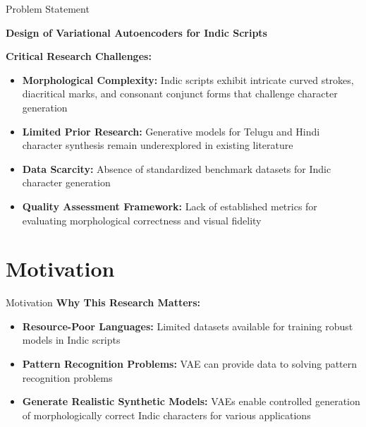\documentclass[aspectratio=169, 12pt]{beamer}
\begin{document}
\begin{frame}{Problem Statement}
    \begin{keypoint}
    \textbf{Design of Variational Autoencoders for Indic Scripts} 
    \end{keypoint}
    
    \vspace{0.5cm}
    \textbf{Critical Research Challenges:}
    \begin{itemize}
        \setlength\itemsep{1em}
        \item \textbf{Morphological Complexity:} Indic scripts exhibit intricate curved strokes, diacritical marks, and consonant conjunct forms that challenge character generation
        \item \textbf{Limited Prior Research:} Generative models for Telugu and Hindi character synthesis remain underexplored in existing literature
        \item \textbf{Data Scarcity:} Absence of standardized benchmark datasets for Indic character generation
        \item \textbf{Quality Assessment Framework:} Lack of established metrics for evaluating morphological correctness and visual fidelity
    \end{itemize}
\end{frame}

\section{Motivation}

\begin{frame}{Motivation}
    \textbf{Why This Research Matters:}
    
    \vspace{0.5cm}
    \begin{itemize}
        \setlength\itemsep{1.2em}
        \item \textbf{Resource-Poor Languages:} Limited datasets available for training robust models in Indic scripts
        
        \item \textbf{Pattern Recognition Problems:} VAE can provide data to solving pattern recognition problems
        
        \item \textbf{Generate Realistic Synthetic Models:} VAEs enable controlled generation of morphologically correct Indic characters for various applications
    \end{itemize}
\end{frame}
\end{document}
